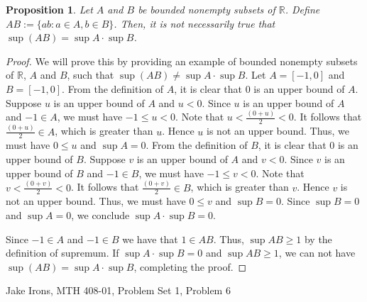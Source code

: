 \documentclass[11 pt]{article}
\newtheorem{proposition}{Proposition}
\newcommand{\newpar}{\vspace{.15in}\noindent}
\begin{document}
\newpar
\begin{proposition}
 Let $A$ and $B$ be bounded nonempty subsets of $\mathbb{R}$. Define $AB :=\{ ab : a \in A, b \in B\}$. Then, it is not necessarily true that $\sup(AB)=\sup A\cdot \sup B$.
\end{proposition}
\begin{proof}
\newpar 
We will prove this by providing an example of bounded nonempty subsets  of $\mathbb{R}$, $A$ and $B$, such that $\sup(AB)\neq \sup A\cdot \sup B$. Let $A=[-1,0]$ and $B=[-1,0]$. From the definition of $A$, it is clear that 0 is an upper bound of $A$. Suppose $u$ is an upper bound of $A$ and $u<0$. Since $u$ is an upper bound of $A$ and $-1\in A$, we must have $-1\le u<0$. Note that $u<\frac{(0+u)}{2}<0$. It follows that $\frac{(0+u)}{2}\in A$, which is greater than $u$. Hence $u$ is not an upper bound. Thus, we must have $0\le u$ and $\sup A=0$. From the definition of $B$, it is clear that 0 is an upper bound of $B$. Suppose $v$ is an upper bound of $A$ and $v<0$. Since $v$ is an upper bound of $B$ and $-1\in B$, we must have $-1\le v<0$. Note that $v<\frac{(0+v)}{2}<0$. It follows that $\frac{(0+v)}{2}\in B$, which is greater than $v$. Hence $v$ is not an upper bound. Thus, we must have $0\le v$ and $\sup B=0$. Since $\sup B=0$ and $\sup A=0$, we conclude $\sup A\cdot \sup B=0$.  

\newpar
Since $-1\in A$ and $-1\in B$ we have that $1\in AB$. Thus, $\sup AB\ge1$ by the definition of supremum. If $\sup A\cdot\sup B=0$ and $\sup AB\ge1$, we can not have $\sup(AB)=\sup A\cdot\sup B$, completing the proof.
\end{proof}
\newpage
\noindent Jake Irons, MTH 408-01, Problem Set 1, Problem 6
\end{document}
